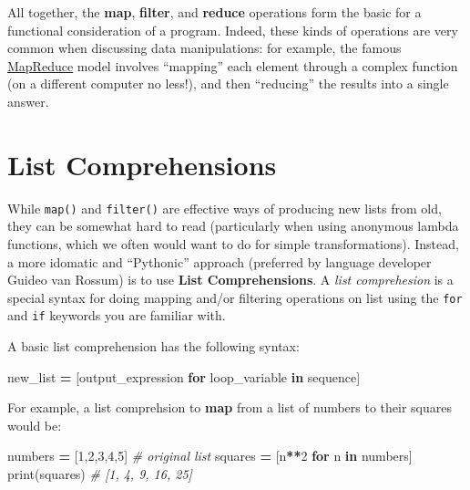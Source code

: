 \documentclass[]{book}
\newenvironment{Shaded}{\begin{snugshade}}{\end{snugshade}}
\newcommand{\KeywordTok}[1]{\textcolor[rgb]{0.13,0.29,0.53}{\textbf{#1}}}
\newcommand{\DecValTok}[1]{\textcolor[rgb]{0.00,0.00,0.81}{#1}}
\newcommand{\CommentTok}[1]{\textcolor[rgb]{0.56,0.35,0.01}{\textit{#1}}}
\newcommand{\ControlFlowTok}[1]{\textcolor[rgb]{0.13,0.29,0.53}{\textbf{#1}}}
\newcommand{\OperatorTok}[1]{\textcolor[rgb]{0.81,0.36,0.00}{\textbf{#1}}}
\newcommand{\BuiltInTok}[1]{#1}
\newcommand{\NormalTok}[1]{#1}
\begin{document}
All together, the \textbf{map}, \textbf{filter}, and \textbf{reduce}
operations form the basic for a functional consideration of a program.
Indeed, these kinds of operations are very common when discussing data
manipulations: for example, the famous
\href{https://en.wikipedia.org/wiki/MapReduce}{MapReduce} model involves
``mapping'' each element through a complex function (on a different
computer no less!), and then ``reducing'' the results into a single
answer.

\hypertarget{list-comprehensions}{\section{List
Comprehensions}\label{list-comprehensions}}

While \texttt{map()} and \texttt{filter()} are effective ways of
producing new lists from old, they can be somewhat hard to read
(particularly when using anonymous lambda functions, which we often
would want to do for simple transformations). Instead, a more idomatic
and ``Pythonic'' approach (preferred by language developer Guideo van
Rossum) is to use \textbf{List Comprehensions}. A \emph{list
comprehesion} is a special syntax for doing mapping and/or filtering
operations on list using the \texttt{for} and \texttt{if} keywords you
are familiar with.

A basic list comprehension has the following syntax:

\begin{Shaded}
\begin{Highlighting}[]
\NormalTok{new_list }\OperatorTok{=}\NormalTok{ [output_expression }\ControlFlowTok{for}\NormalTok{ loop_variable }\KeywordTok{in}\NormalTok{ sequence]}
\end{Highlighting}
\end{Shaded}

For example, a list comprehsion to \textbf{map} from a list of numbers
to their squares would be:

\begin{Shaded}
\begin{Highlighting}[]
\NormalTok{numbers }\OperatorTok{=}\NormalTok{ [}\DecValTok{1}\NormalTok{,}\DecValTok{2}\NormalTok{,}\DecValTok{3}\NormalTok{,}\DecValTok{4}\NormalTok{,}\DecValTok{5}\NormalTok{]  }\CommentTok{# original list}
\NormalTok{squares }\OperatorTok{=}\NormalTok{ [n}\OperatorTok{**}\DecValTok{2} \ControlFlowTok{for}\NormalTok{ n }\KeywordTok{in}\NormalTok{ numbers]}
\BuiltInTok{print}\NormalTok{(squares)  }\CommentTok{# [1, 4, 9, 16, 25]}
\end{Highlighting}
\end{Shaded}
\end{document}
